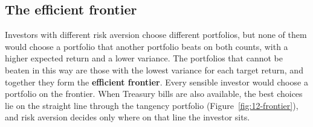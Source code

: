 \subsection{The efficient frontier}
\label{sec:12-frontier}

Investors with different risk aversion choose different portfolios, but none of them would choose a portfolio that another portfolio beats on both counts, with a higher expected return and a lower variance. The portfolios that cannot be beaten in this way are those with the lowest variance for each target return, and together they form the \textbf{efficient frontier}. Every sensible investor would choose a portfolio on the frontier. When Treasury bills are also available, the best choices lie on the straight line through the tangency portfolio (Figure~\ref{fig:12-frontier}), and risk aversion decides only where on that line the investor sits.


